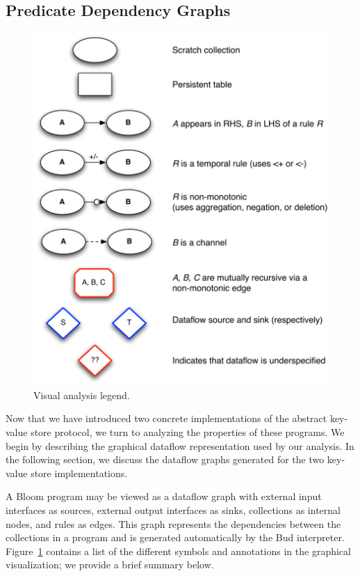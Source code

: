 \subsection{Predicate Dependency Graphs}
\begin{figure}[t]
\centering
\includegraphics[width=0.9\linewidth]{fig/mittalk_legend.pdf}
\vspace{-10pt}
\caption{Visual analysis legend.}
\label{fig:analysis-legend}
\vspace{-2pt}
\end{figure}

Now that we have introduced two concrete implementations of the abstract
key-value store protocol, we turn to analyzing the properties of these
programs. We begin by describing the graphical dataflow representation used by
our analysis. In the following section, we discuss the dataflow graphs generated for
the two key-value store implementations.

A Bloom program may be viewed as a dataflow graph with external input interfaces
as sources, external output interfaces as sinks, collections as internal nodes,
and rules as edges. This graph represents the dependencies between the
collections in a program and is generated automatically by the Bud
interpreter. Figure~\ref{fig:analysis-legend} contains a list of the different
symbols and annotations in the graphical visualization; we provide a brief
summary below.

